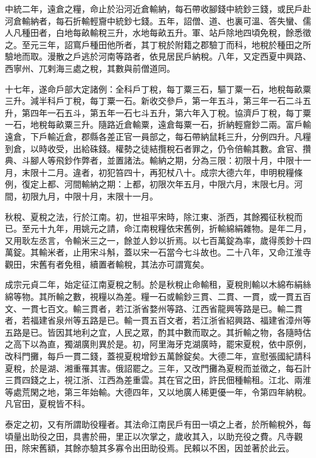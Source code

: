 \begin{pinyinscope}
 中統二年，遠倉之糧，命止於沿河近倉輸納，每石帶收腳錢中統鈔三錢，或民戶赴河倉輸納者，每石折輸輕齎中統鈔七錢。五年，詔僧、道、也裏可溫、答失蠻、儒人凡種田者，白地每畝輸稅三升，水地每畝五升。軍、站戶除地四頃免稅，餘悉徵之。至元三年，詔窵戶種田他所者，其丁稅於附籍之郡驗丁而科，地稅於種田之所驗地而取。漫散之戶逃於河南等路者，依見居民戶納稅。八年，又定西夏中興路、西寧州、兀剌海三處之稅，其數與前僧道同。



 十七年，遂命戶部大定諸例：全科戶丁稅，每丁粟三石，驅丁粟一石，地稅每畝粟三升。減半科戶丁稅，每丁粟一石。新收交參戶，第一年五斗，第三年一石二斗五升，第四年一石五斗，第五年一石七斗五升，第六年入丁稅。協濟戶丁稅，每丁粟一石，地稅每畝粟三升。隨路近倉輸粟，遠倉每粟一石，折納輕齎鈔二兩。富戶輸遠倉，下戶輸近倉，郡縣各差正官一員部之，每石帶納鼠耗三升，分例四升。凡糧到倉，以時收受，出給硃錢。權勢之徒結攬稅石者罪之，仍令倍輸其數。倉官、攢典、斗腳人等飛鈔作弊者，並置諸法。輸納之期，分為三限：初限十月，中限十一月，末限十二月。違者，初犯笞四十，再犯杖八十。成宗大德六年，申明稅糧條例，復定上都、河間輸納之期：上都，初限次年五月，中限六月，末限七月。河間，初限九月，中限十月，末限十一月。



 秋稅、夏稅之法，行於江南。初，世祖平宋時，除江東、浙西，其餘獨征秋稅而已。至元十九年，用姚元之請，命江南稅糧依宋舊例，折輸綿絹雜物。是年二月，又用耿左丞言，令輸米三之一，餘並人鈔以折焉。以七百萬錠為率，歲得羨鈔十四萬錠。其輸米者，止用宋斗斛，蓋以宋一石當今七斗故也。二十八年，又命江淮寺觀田，宋舊有者免租，續置者輸稅，其法亦可謂寬矣。



 成宗元貞二年，始定征江南夏稅之制。於是秋稅止命輸租，夏稅則輸以木綿布絹絲綿等物。其所輸之數，視糧以為差。糧一石或輸鈔三貫、二貫、一貫，或一貫五百文、一貫七百文。輸三貫者，若江浙省婺州等路、江西省龍興等路是已。輸二貫者，若福建省泉州等五路是已。輸一貫五百文者，若江浙省紹興路、福建省漳州等五路是已。皆因其地利之宜，人民之眾，酌其中數而取之。其折輸之物，各隨時估之高下以為直，獨湖廣則異於是。初，阿里海牙克湖廣時，罷宋夏稅，依中原例，改科門攤，每戶一貫二錢，蓋視夏稅增鈔五萬餘錠矣。大德二年，宣慰張國紀請科夏稅，於是湖、湘重罹其害。俄詔罷之。三年，又改門攤為夏稅而並徵之，每石計三貫四錢之上，視江浙、江西為差重雲。其在官之田，許民佃種輸租。江北、兩淮等處荒閑之地，第三年始輸。大德四年，又以地廣人稀更優一年，令第四年納稅。凡官田，夏稅皆不科。



 泰定之初，又有所謂助役糧者。其法命江南民戶有田一頃之上者，於所輸稅外，每頃量出助役之田，具書於冊，里正以次掌之，歲收其入，以助充役之費。凡寺觀田，除宋舊額，其餘亦驗其多寡令出田助役焉。民賴以不困，因並著於此云。




\end{pinyinscope}

